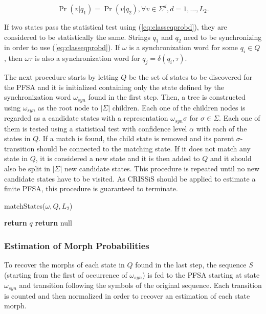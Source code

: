 {\begin{equation}\label{eq:classeqprobd}
\Pr(v|q_1) = \Pr(v|q_2), \forall v \in \Sigma^d, d = 1,\ldots,L_2.
\end{equation}

\noindent If two states pass the statistical test using (\ref{eq:classeqprobd}), they are considered to be statistically the same. Strings $q_1$ and $q_2$ need to be synchronizing in order to use (\ref{eq:classeqprobd}). If $\omega$ is a synchronization word for some $q_i \in Q$, then $\omega\tau$ is also a synchronization word for $q_j = \delta(q_i,\tau)$.

The next procedure starts by letting $Q$ be the set of states to be discovered for the PFSA and it is initialized containing only the state defined by the synchronization word $\omega_{syn}$ found in the first step. Then, a tree is constructed using $\omega_{syn}$ as the root node to $|\Sigma|$ children. Each one of the children nodes is regarded as a candidate states with a representation $\omega_{syn}\sigma$ for $\sigma\in\Sigma$. Each one of them is tested using a statistical test with confidence level $\alpha$ with each of the states in $Q$. If a match is found, the child state is removed and its parent $\sigma$-transition should be connected to the matching state. If it does not match any state in $Q$, it is considered a new state and it is then added to $Q$ and it should also be split in $|\Sigma|$ new candidate states. This procedure is repeated until no new candidate states have to be visited. As CRISSiS should be applied to estimate a finite PFSA, this procedure is guaranteed to terminate. 

\begin{algorithm}[t]
\caption{matchStates($\omega, Q, L_2$)\label{alg:matchstates}}
\begin{algorithmic}[1]
					\State \textbf{return} $q$
				\EndIf
			\EndFor
		\EndFor
	\EndFor
	\State \textbf{return} null
\end{algorithmic}
\end{algorithm}

\subsubsection{Estimation of Morph Probabilities}

To recover the morphs of each state in $Q$ found in the last step, the sequence \textit{S} (starting from the first of occurrence of $\omega_{syn}$) is fed to the PFSA starting at state $\omega_{syn}$ and transition following the symbols of the original sequence. Each transition is counted and then normalized in order to recover an estimation of each state morph.

}
